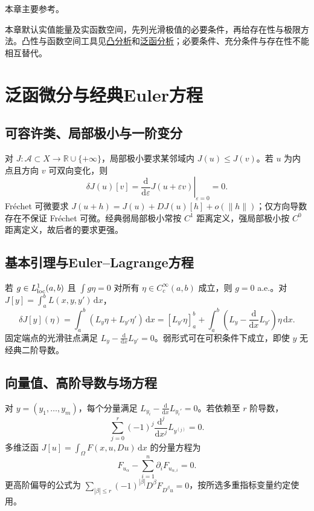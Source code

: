 \documentclass[../main.tex]{subfiles}
\begin{document}
本章主要参考\cite{variation,brezis}。

本章默认实值能量及实函数空间，先列光滑极值的必要条件，再给存在性与极限方法。凸性与函数空间工具见\hyperref[chap:convex-analysis]{凸分析}和\hyperref[chap:functional-analysis]{泛函分析}；必要条件、充分条件与存在性不能相互替代。
\section{泛函微分与经典Euler方程}
\subsection{可容许类、局部极小与一阶变分}
对 $J:\mathcal A\subset X\to\mathbb R\cup\{+\infty\}$，局部极小要求某邻域内 $J(u)\le J(v)$。若 $u$ 为内点且方向 $v$ 可双向变化，则
\[
\delta J(u)[v]=\left.\frac{\mathrm d}{\mathrm d\varepsilon}J(u+\varepsilon v)\right|_{\varepsilon=0}=0.
\]
Fréchet 可微要求 $J(u+h)=J(u)+DJ(u)[h]+o(\|h\|)$；仅方向导数存在不保证 Fréchet 可微。经典弱局部极小常按 $C^1$ 距离定义，强局部极小按 $C^0$ 距离定义，故后者的要求更强。
\subsection{基本引理与Euler--Lagrange方程}
若 $g\in L^1_{\rm loc}(a,b)$ 且 $\int g\eta=0$ 对所有 $\eta\in C_c^\infty(a,b)$ 成立，则 $g=0$ a.e.。对 $J[y]=\int_a^bL(x,y,y')\,\mathrm dx$，
\[
\delta J[y](\eta)=\int_a^b(L_y\eta+L_{y'}\eta')\,\mathrm dx
=[L_{y'}\eta]_a^b+\int_a^b\left(L_y-\frac{\mathrm d}{\mathrm dx}L_{y'}\right)\eta\,\mathrm dx.
\]
固定端点的光滑驻点满足 $L_y-\frac{\mathrm d}{\mathrm dx}L_{y'}=0$。弱形式可在可积条件下成立，即使 $y$ 无经典二阶导数。
\subsection{向量值、高阶导数与场方程}
对 $y=(y_1,\ldots,y_m)$，每个分量满足 $L_{y_i}-\frac{\mathrm d}{\mathrm dx}L_{y_i'}=0$。若依赖至 $r$ 阶导数，
\[
\sum_{j=0}^r(-1)^j\frac{\mathrm d^j}{\mathrm dx^j}L_{y^{(j)}}=0.
\]
多维泛函 $J[u]=\int_\Omega F(x,u,Du)\,\mathrm dx$ 的分量方程为
\[
F_{u_\alpha}-\sum_{i=1}^n\partial_iF_{u_{\alpha,i}}=0.
\]
更高阶偏导的公式为 $\sum_{|\beta|\le r}(-1)^{|\beta|}D^\beta F_{D^\beta u}=0$，按所选多重指标变量约定使用。
\end{document}

